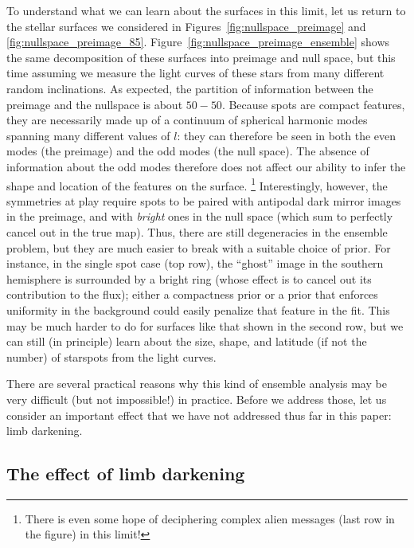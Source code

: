 \documentclass[modern]{aastex62}
\begin{document}
To understand what we can learn about the surfaces in this limit, let us
return to the stellar surfaces we considered in Figures~\ref{fig:nullspace_preimage}
and \ref{fig:nullspace_preimage_85}.
Figure~\ref{fig:nullspace_preimage_ensemble} shows the same decomposition of
these surfaces into preimage and null space, but this time assuming we measure
the light curves of these stars from many different random inclinations.
As expected, the partition of information between the preimage and the nullspace
is about $50{-}50$.
Because spots are compact features, they
are necessarily made up of a continuum of spherical harmonic modes spanning
many different values of $l$: they can therefore be seen in both the even
modes (the preimage) and the odd modes (the null space). The absence of
information about the odd modes therefore does not affect our ability to
infer the shape and location of the features on the surface.%
\footnote{
    There is even some hope of deciphering complex alien messages
    (last row in the figure) in this limit!
}
Interestingly, however,
the symmetries at play require spots to be paired with antipodal dark mirror
images in the preimage, and with \emph{bright} ones in the null space
(which sum to perfectly cancel out in the true map). Thus, there are still
degeneracies in the ensemble problem, but they are much easier to break
with a suitable choice of prior. For instance, in the single spot case
(top row), the ``ghost'' image in the southern hemisphere is surrounded by
a bright ring (whose effect is to cancel out its contribution to the flux);
either a compactness prior or a prior that enforces uniformity in the
background could easily penalize that feature in the fit. This may be
much harder to do for surfaces like that shown in the second row, but
we can still (in principle) learn about the size, shape, and latitude
(if not the number) of starspots from the light curves.

There are several practical reasons why this kind of ensemble analysis
may be very difficult (but not impossible!) in practice. Before
we address those, let us consider an important effect that we have not
addressed thus far in this paper: limb darkening.

\subsection{The effect of limb darkening}
\label{sec:limbdark}
\end{document}
